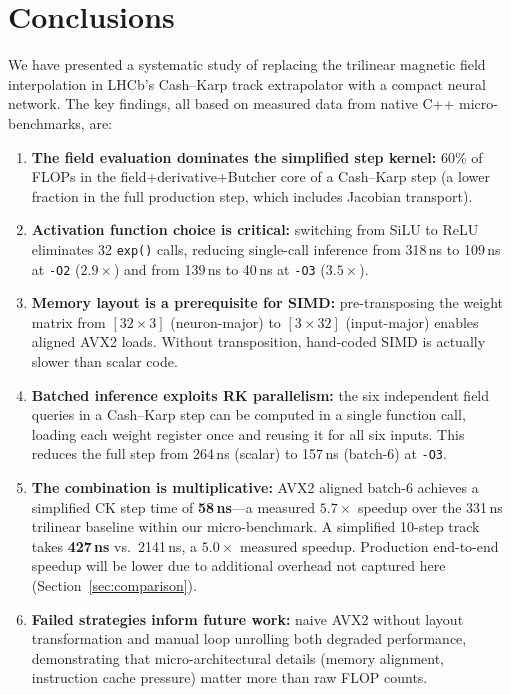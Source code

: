 \documentclass[11pt,a4paper]{article}
\begin{document}
\section{Conclusions}
\label{sec:conclusions}

We have presented a systematic study of replacing the trilinear
magnetic field interpolation in LHCb's Cash--Karp track extrapolator
with a compact neural network.  The key findings, all based on
measured data from native C++ micro-benchmarks, are:

\begin{enumerate}
    \item \textbf{The field evaluation dominates the simplified
          step kernel:} 60\% of FLOPs in the field+derivative+Butcher
          core of a Cash--Karp step (a lower fraction in the full
          production step, which includes Jacobian transport).

    \item \textbf{Activation function choice is critical:} switching
          from SiLU to ReLU eliminates 32 \texttt{exp()} calls, reducing
          single-call inference from 318\,ns to 109\,ns at \texttt{-O2}
          ($2.9\times$) and from 139\,ns to 40\,ns at \texttt{-O3}
          ($3.5\times$).

    \item \textbf{Memory layout is a prerequisite for SIMD:}
          pre-transposing the weight matrix from $[32 \times 3]$
          (neuron-major) to $[3 \times 32]$ (input-major) enables
          aligned AVX2 loads.  Without transposition, hand-coded SIMD
          is actually slower than scalar code.

    \item \textbf{Batched inference exploits RK parallelism:} the six
          independent field queries in a Cash--Karp step can be computed
          in a single function call, loading each weight register once
          and reusing it for all six inputs.  This reduces the full
          step from 264\,ns (scalar) to 157\,ns (batch-6) at \texttt{-O3}.

    \item \textbf{The combination is multiplicative:} AVX2 aligned
          batch-6 achieves a simplified CK step time of
          \textbf{58\,ns}---a measured $\mathbf{5.7\times}$ speedup
          over the 331\,ns trilinear baseline within our micro-benchmark.
          A simplified 10-step track takes
          \textbf{427\,ns} vs.\ 2141\,ns, a $\mathbf{5.0\times}$
          measured speedup.  Production end-to-end speedup will be
          lower due to additional overhead not captured here
          (Section~\ref{sec:comparison}).

    \item \textbf{Failed strategies inform future work:} naive AVX2
          without layout transformation and manual loop unrolling both
          degraded performance, demonstrating that micro-architectural
          details (memory alignment, instruction cache pressure) matter
          more than raw FLOP counts.
\end{enumerate}
\end{document}
